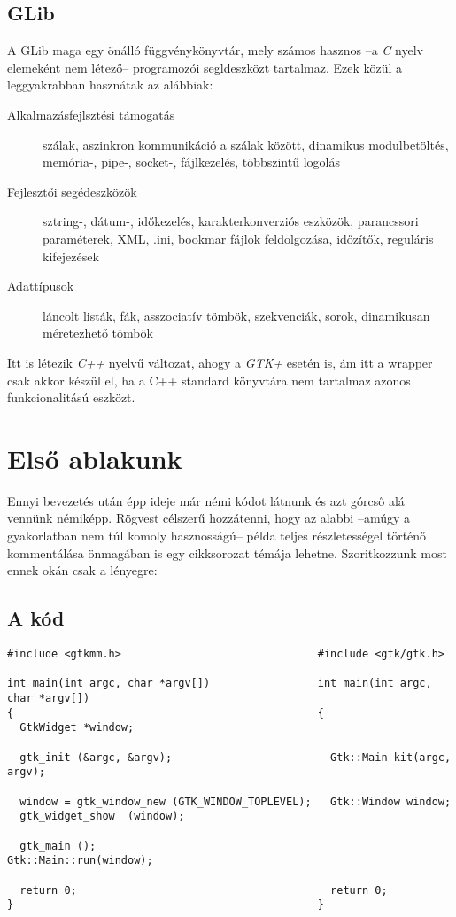 \subsection{GLib}
A GLib maga egy önálló függvénykönyvtár, mely számos hasznos --a \textit{C} nyelv elemeként nem létező-- programozói segldeszközt tartalmaz. Ezek közül a leggyakrabban hasznátak az alábbiak:

\begin{description}
 \item[Alkalmazásfejlsztési támogatás] szálak, aszinkron kommunikáció a szálak között, dinamikus modulbetöltés, memória-, pipe-, socket-, fájlkezelés, többszintű logolás
 \item[Fejlesztői segédeszközök] sztring-, dátum-, időkezelés, karakterkonverziós eszközök, parancssori paraméterek, XML, .ini, bookmar fájlok feldolgozása, időzítők, reguláris kifejezések
 \item[Adattípusok] láncolt listák, fák, asszociatív tömbök, szekvenciák, sorok, dinamikusan méretezhető tömbök
\end{description}

Itt is létezik \textit{C++} nyelvű változat, ahogy a \textit{GTK+} esetén is, ám itt a wrapper csak akkor készül el, ha a C++ standard könyvtára nem tartalmaz azonos funkcionalitású eszközt.

\section{Első ablakunk}

Ennyi bevezetés után épp ideje már némi kódot látnunk és azt górcső alá vennünk némiképp. Rögvest célszerű hozzátenni, hogy az alabbi --amúgy a gyakorlatban nem túl komoly hasznosságú-- példa teljes részletességel történő kommentálása önmagában is egy cikksorozat témája lehetne. Szoritkozzunk most ennek okán csak a lényegre:

\subsection{A kód}

\vspace{16pt}
\fontsize{8pt}{8pt}
\begin{verbatim}
#include <gtkmm.h>                               #include <gtk/gtk.h>

int main(int argc, char *argv[])                 int main(int argc, char *argv[])
{                                                {
  GtkWidget *window;

  gtk_init (&argc, &argv);                         Gtk::Main kit(argc, argv);

  window = gtk_window_new (GTK_WINDOW_TOPLEVEL);   Gtk::Window window;
  gtk_widget_show  (window);

  gtk_main ();                                     Gtk::Main::run(window);

  return 0;                                        return 0;
}                                                }
\end{verbatim} 

